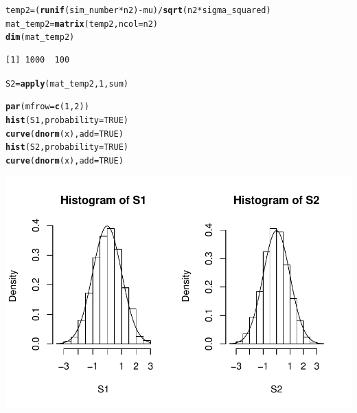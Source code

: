 \documentclass[12pt, a4paper]{article}\usepackage[]{graphicx}\usepackage[]{color}
\makeatletter
\def\maxwidth{ %
  \ifdim\Gin@nat@width>\linewidth
    \linewidth
  \else
    \Gin@nat@width
  \fi
}
\newcommand{\hlnum}[1]{\textcolor[rgb]{0.686,0.059,0.569}{#1}}%
\newcommand{\hlopt}[1]{\textcolor[rgb]{0,0,0}{#1}}%
\newcommand{\hlstd}[1]{\textcolor[rgb]{0.345,0.345,0.345}{#1}}%
\newcommand{\hlkwb}[1]{\textcolor[rgb]{0.69,0.353,0.396}{#1}}%
\newcommand{\hlkwc}[1]{\textcolor[rgb]{0.333,0.667,0.333}{#1}}%
\newcommand{\hlkwd}[1]{\textcolor[rgb]{0.737,0.353,0.396}{\textbf{#1}}}%
\newenvironment{kframe}{%
 \def\at@end@of@kframe{}%
 \ifinner\ifhmode%
  \def\at@end@of@kframe{\end{minipage}}%
  \begin{minipage}{\columnwidth}%
 \fi\fi%
 \def\FrameCommand##1{\hskip\@totalleftmargin \hskip-\fboxsep
 \colorbox{shadecolor}{##1}\hskip-\fboxsep
     \hskip-\linewidth \hskip-\@totalleftmargin \hskip\columnwidth}%
 \MakeFramed {\advance\hsize-\width
   \@totalleftmargin\z@ \linewidth\hsize
   \@setminipage}}%
 {\par\unskip\endMakeFramed%
 \at@end@of@kframe}
\newenvironment{knitrout}{}{} %
\makeatother
\begin{document}
\begin{enumerate}
\begin{enumerate}
\begin{knitrout}
\begin{kframe}
\begin{alltt}
\hlstd{temp2} \hlkwb{=} \hlstd{(}\hlkwd{runif}\hlstd{(sim_number} \hlopt{*} \hlstd{n2)} \hlopt{-} \hlstd{mu)}\hlopt{/}\hlkwd{sqrt}\hlstd{(n2} \hlopt{*} \hlstd{sigma_squared)}
\hlstd{mat_temp2} \hlkwb{=} \hlkwd{matrix}\hlstd{(temp2,} \hlkwc{ncol} \hlstd{= n2)}
\hlkwd{dim}\hlstd{(mat_temp2)}
\end{alltt}
\begin{verbatim}
[1] 1000  100
\end{verbatim}
\begin{alltt}
\hlstd{S2} \hlkwb{=} \hlkwd{apply}\hlstd{(mat_temp2,} \hlnum{1}\hlstd{, sum)}
\end{alltt}
\end{kframe}
\end{knitrout}
    
    
\begin{knitrout}\small
{}\color{fgcolor}\begin{kframe}
\begin{alltt}
\hlkwd{par}\hlstd{(}\hlkwc{mfrow} \hlstd{=} \hlkwd{c}\hlstd{(}\hlnum{1}\hlstd{,} \hlnum{2}\hlstd{))}
\hlkwd{hist}\hlstd{(S1,} \hlkwc{probability} \hlstd{=} \hlnum{TRUE}\hlstd{)}
\hlkwd{curve}\hlstd{(}\hlkwd{dnorm}\hlstd{(x),} \hlkwc{add} \hlstd{=} \hlnum{TRUE}\hlstd{)}
\hlkwd{hist}\hlstd{(S2,} \hlkwc{probability} \hlstd{=} \hlnum{TRUE}\hlstd{)}
\hlkwd{curve}\hlstd{(}\hlkwd{dnorm}\hlstd{(x),} \hlkwc{add} \hlstd{=} \hlnum{TRUE}\hlstd{)}
\end{alltt}
\end{kframe}

{\centering \includegraphics[width=\maxwidth]{figure/unnamed-chunk-8-1} 

}


\end{knitrout}
    
    \vfill
    
  \end{enumerate}
\end{enumerate}
\end{document}
